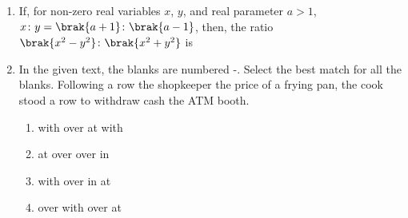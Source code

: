 \documentclass[journal,12pt,onecolumn]{IEEEtran}
\theoremstyle{remark}
\begin{document}
\begin{enumerate}[start=1, label=Q.\arabic*]
    \hfill{}

    \item If, for non-zero real variables $x$, $y$, and real parameter $a > 1$,
    $x \colon y = \brak{a+1} \colon \brak{a-1}$,
    then, the ratio $\brak{x^2 - y^2} \colon \brak{x^2 + y^2}$ is
    \begin{enumerate}
    \end{enumerate}

    \hfill{}

    \item In the given text, the blanks are numbered -. Select the best match for all the blanks.
    Following a row \underline{\hspace{1cm}}  the shopkeeper \underline{\hspace{1cm}}  the price of a frying pan, the cook stood \underline{\hspace{1cm}}  a row to withdraw cash \underline{\hspace{1cm}}  the ATM booth.
    \begin{enumerate}
        \item {} with  over  at  with
        \item {} at  over  over  in
        \item {} with  over  in  at
        \item {} over  with  over  at
    \end{enumerate}

    \hfill{}


\end{enumerate}
\end{document}
